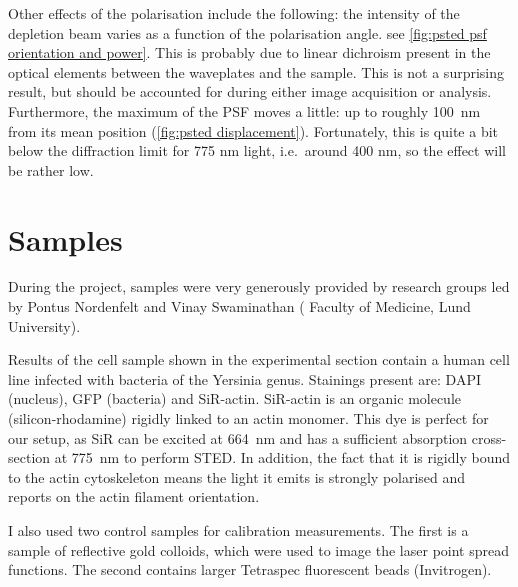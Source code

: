 Other effects of the polarisation include the following: the intensity of the depletion beam varies as a function of the polarisation angle. see \autoref{fig:psted psf orientation and power}. This is probably due to linear dichroism present in the optical elements between the waveplates and the sample. This is not a surprising result, but should be accounted for during either image acquisition or analysis. Furthermore, the maximum of the PSF moves a little: up to roughly 100~nm from its mean position (\autoref{fig:psted displacement}). Fortunately, this is quite a bit below the diffraction limit for 775 nm light, i.e.~around 400 nm, so the effect will be rather low.

\section{Samples}
\label{sec:samples}

During the project, samples were very generously provided by research groups led by Pontus Nordenfelt and Vinay Swaminathan (%
Faculty of Medicine, Lund University).

Results of the cell sample shown in the experimental section contain a human cell line infected with bacteria of the Yersinia genus. Stainings present are: DAPI (nucleus), GFP (bacteria) and SiR-actin. SiR-actin is an organic molecule (silicon-rhodamine) rigidly linked to an actin monomer. This dye is perfect for our setup, as SiR can be excited at 664~nm and has a sufficient absorption cross-section at 775~nm to perform STED. In addition, the fact that it is rigidly bound to the actin cytoskeleton means the light it emits is strongly polarised and reports on the actin filament orientation.

I also used two control samples for calibration measurements. The first is a sample of reflective gold colloids, which were used to image the laser point spread functions. The second contains larger Tetraspec fluorescent beads (Invitrogen).